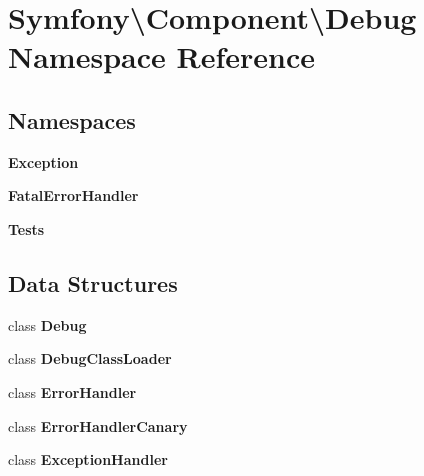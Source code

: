 \section{Symfony\textbackslash{}Component\textbackslash{}Debug Namespace Reference}
\label{namespace_symfony_1_1_component_1_1_debug}
\subsection*{Namespaces}
\begin{DoxyCompactItemize}
\item 
 {\bf Exception}
\item 
 {\bf Fatal\+Error\+Handler}
\item 
 {\bf Tests}
\end{DoxyCompactItemize}
\subsection*{Data Structures}
\begin{DoxyCompactItemize}
\item 
class {\bf Debug}
\item 
class {\bf Debug\+Class\+Loader}
\item 
class {\bf Error\+Handler}
\item 
class {\bf Error\+Handler\+Canary}
\item 
class {\bf Exception\+Handler}
\end{DoxyCompactItemize}
